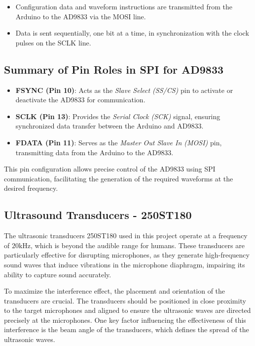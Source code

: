 \begin{itemize}
    \item Configuration data and waveform instructions are transmitted from the Arduino to the AD9833 via the MOSI line.
    \item Data is sent sequentially, one bit at a time, in synchronization with the clock pulses on the SCLK line.
\end{itemize}

\subsection{Summary of Pin Roles in SPI for AD9833}

\begin{itemize}
    \item \textbf{FSYNC (Pin 10)}: Acts as the \textit{Slave Select (SS/CS)} pin to activate or deactivate the AD9833 for communication.
    \item \textbf{SCLK (Pin 13)}: Provides the \textit{Serial Clock (SCK)} signal, ensuring synchronized data transfer between the Arduino and AD9833.
    \item \textbf{FDATA (Pin 11)}: Serves as the \textit{Master Out Slave In (MOSI)} pin, transmitting data from the Arduino to the AD9833.
\end{itemize}

This pin configuration allows precise control of the AD9833 using SPI communication, facilitating the generation of the required waveforms at the desired frequency.

\subsection{Ultrasound Transducers - 250ST180 }

The ultrasonic transducers 250ST180 \cite{Ultrasonic_Transducer} used in this project operate at a frequency of $20 \text{kHz}$, which is beyond the audible range for humans. These transducers are particularly effective for disrupting microphones, as they generate high-frequency sound waves that induce vibrations in the microphone diaphragm, impairing its ability to capture sound accurately.

To maximize the interference effect, the placement and orientation of the transducers are crucial. The transducers should be positioned in close proximity to the target microphones and aligned to ensure the ultrasonic waves are directed precisely at the microphones. One key factor influencing the effectiveness of this interference is the beam angle of the transducers, which defines the spread of the ultrasonic waves.

